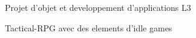 Projet d'objet et developpement d'applications L3

Tactical-\/\-R\-P\-G avec des elements d'idle games 